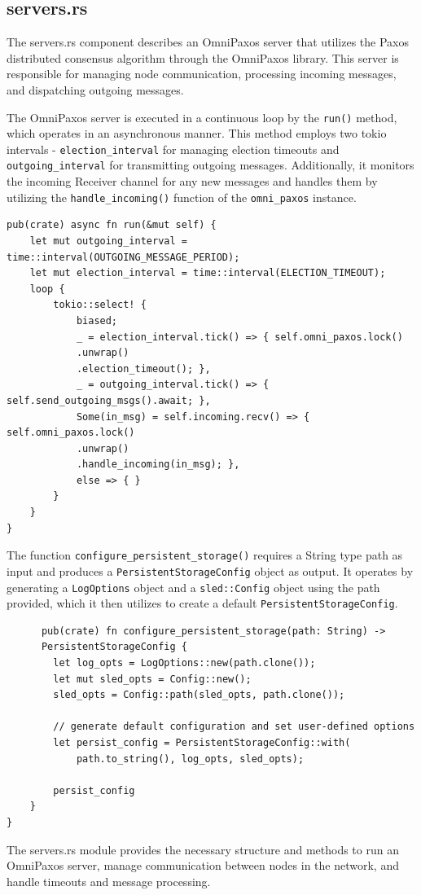 \documentclass[a4paper, 11pt]{article}
\begin{document}
\subsection{servers.rs}
The servers.rs component describes an OmniPaxos server that utilizes the Paxos distributed consensus algorithm through the OmniPaxos library. This server is responsible for managing node communication, processing incoming messages, and dispatching outgoing messages.
\par
The OmniPaxos server is executed in a continuous loop by the \verb|run()| method, which operates in an asynchronous manner. This method employs two tokio intervals - \verb|election_interval| for managing election timeouts and \verb|outgoing_interval| for transmitting outgoing messages. Additionally, it monitors the incoming Receiver channel for any new messages and handles them by utilizing the \verb|handle_incoming()| function of the \verb|omni_paxos| instance.
\begin{verbatim}
pub(crate) async fn run(&mut self) {
    let mut outgoing_interval = time::interval(OUTGOING_MESSAGE_PERIOD);
    let mut election_interval = time::interval(ELECTION_TIMEOUT);
    loop {
        tokio::select! {
            biased;
            _ = election_interval.tick() => { self.omni_paxos.lock()
            .unwrap()
            .election_timeout(); },
            _ = outgoing_interval.tick() => { self.send_outgoing_msgs().await; },
            Some(in_msg) = self.incoming.recv() => { self.omni_paxos.lock()
            .unwrap()
            .handle_incoming(in_msg); },
            else => { }
        }
    }
}
\end{verbatim}
\par
The function \verb|configure_persistent_storage()| requires a String type path as input and produces a \verb|PersistentStorageConfig| object as output. It operates by generating a \verb|LogOptions| object and a \verb|sled::Config| object using the path provided, which it then utilizes to create a default \verb|PersistentStorageConfig|.
\begin{verbatim}
      pub(crate) fn configure_persistent_storage(path: String) -> 
      PersistentStorageConfig {
        let log_opts = LogOptions::new(path.clone());
        let mut sled_opts = Config::new();
        sled_opts = Config::path(sled_opts, path.clone());

        // generate default configuration and set user-defined options
        let persist_config = PersistentStorageConfig::with(
            path.to_string(), log_opts, sled_opts);

        persist_config
    }
}
\end{verbatim}
\par
The servers.rs module provides the necessary structure and methods to run an OmniPaxos server, manage communication between nodes in the network, and handle timeouts and message processing.
\end{document}
